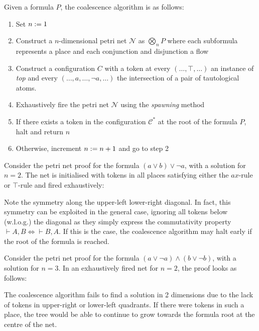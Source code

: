     \begin{definition*}[Coalescence]
        Given a formula $P$, the coalescence algorithm is as follows:
        \begin{enumerate}[nosep]
            \item Set  $n := 1$
            \item Construct a $n$-dimensional petri net $\mathcal{N}$ as $\bigotimes_n P$ where each subformula represents a place and each conjunction and disjunction a flow
            \item Construct a configuration $C$ with a token at every $(\ldots, \top, \ldots)$ an instance of \textit{top} and every $(\ldots, a, \ldots, \neg a, \ldots)$ the intersection of a pair of tautological atoms.
            \item Exhaustively fire the petri net $\mathcal{N}$ using the \textit{spawning} method
            \item If there exists a token in the configuration $\mathcal{C^*}$ at the root of the formula $P$, halt and return $n$
            \item Otherwise, increment $n := n + 1$ and go to step 2
        \end{enumerate}
    \end{definition*}
    
    \begin{example*}
        Consider the petri net proof for the formula $(a \vee b) \vee \neg a$, with a solution for $n = 2$.
        The net is initialised with tokens in all places satisfying either the $ax$-rule or $\top$-rule and fired exhaustively:
        
    \end{example*}

    \begin{remark*}
        Note the symmetry along the upper-left lower-right diagonal.
        In fact, this symmetry can be exploited in the general case, ignoring all tokens below (w.l.o.g.) the diagonal as they simply express the commutativity property $\vdash A, B \iff \vdash B, A$.
        If this is the case, the coalescence algorithm may halt early if the root of the formula is reached.
    \end{remark*}

    \begin{example*}
        Consider the petri net proof for the formula $(a \vee \neg a) \wedge (b \vee \neg b)$, with a solution for $n = 3$.
        In an exhaustively fired net for $n = 2$, the proof looks as follows:
        
        The coalescence algorithm fails to find a solution in 2 dimensions due to the lack of tokens in upper-right or lower-left quadrants.
        If there were tokens in such a place, the tree would be able to continue to grow towards the formula root at the centre of the net.
    \end{example*}

